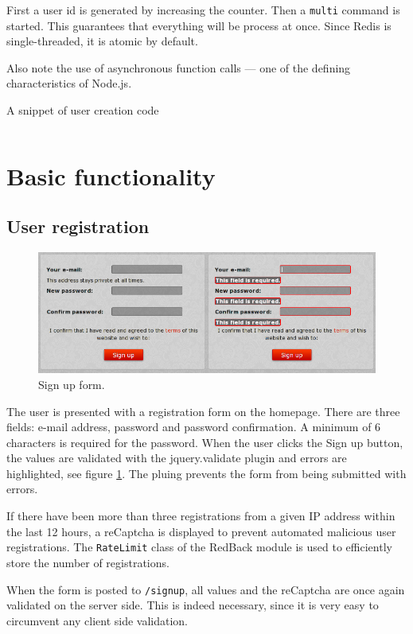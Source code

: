 \documentclass[12pt,oneside]{fithesis}
\begin{document}
	First a user id is generated by increasing the counter. Then a \texttt{multi} command is started. This guarantees that everything will be process at once. Since Redis is single-threaded, it is atomic by default.
	
	Also note the use of asynchronous function calls --- one of the defining characteristics of Node.js.
	\begin{program}[h!]
	\caption{A snippet of user creation code}
	\label{code:ex-user}
	\inputminted[fontsize=\footnotesize, linenos=true]{javascript}{ex-user.js}
	\end{program}
	
	
\section{Basic functionality}
	\subsection{User registration}	
	  \begin{figure}[h]
	  \centering
	    \includegraphics[width=1.0\textwidth]{screen-signup.png}
		  \caption{Sign up form.}
		  \label{fig:screen-signup}
	  \end{figure}
		The user is presented with a registration form on the homepage. There are three fields: e-mail address, password and password confirmation. A minimum of 6 characters is required for the password. When the user clicks the Sign up button, the values are validated with the jquery.validate plugin and errors are highlighted, see figure \ref{fig:screen-signup}. The pluing prevents the form from being submitted with errors.
		
		If there have been more than three registrations from a given IP address within the last 12 hours, a reCaptcha is displayed to prevent automated malicious user registrations. The \texttt{RateLimit} class of the RedBack module is used to efficiently store the number of registrations.
		
		When the form is posted to \texttt{/signup}, all values and the reCaptcha are once again validated on the server side. This is indeed necessary, since it is very easy to circumvent any client side validation.
		
\end{document}
